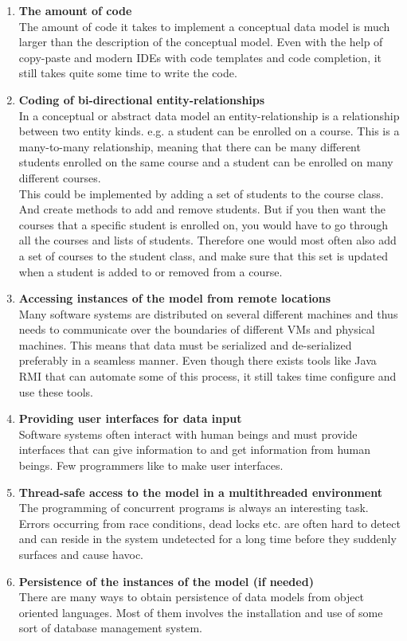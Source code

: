 \begin{enumerate}
\item \textbf{The amount of code}\\
The amount of code it takes to implement a conceptual data model is
much larger than the description of the conceptual model. Even with
the help of copy-paste and modern IDEs with code templates and code
completion, it still takes quite some time to write the code.
\item \textbf{Coding of bi-directional entity-relationships}\\
In a conceptual or abstract data model an entity-relationship is a
relationship between two entity kinds. e.g. a student can be enrolled
on a course. This is a many-to-many relationship, meaning that there
can be many different students enrolled on the same course and a student
can be enrolled on many different courses.\\
This could be implemented by adding a set of students to the course
class. And create methods to add and remove students. But if you then
want the courses that a specific student is enrolled on, you would
have to go through all the courses and lists of students. Therefore
one would most often also add a set of courses to the student class,
and make sure that this set is updated when a student is added to
or removed from a course.
\item \textbf{Accessing instances of the model from remote locations}\\
Many software systems are distributed on several different machines
and thus needs to communicate over the boundaries of different VMs
and physical machines. This means that data must be serialized and
de-serialized preferably in a seamless manner. Even though there exists
tools like Java RMI that can automate some of this process, it still
takes time configure and use these tools.
\item \textbf{Providing user interfaces for data input}\\
Software systems often interact with human beings and must provide
interfaces that can give information to and get information from human
beings. Few programmers like to make user interfaces.
\item \textbf{Thread-safe access to the model in a multithreaded environment}\\
The programming of concurrent programs is always an interesting task.
Errors occurring from race conditions, dead locks etc. are often hard
to detect and can reside in the system undetected for a long time
before they suddenly surfaces and cause havoc.
\item \textbf{Persistence of the instances of the model (if needed)}\\
There are many ways to obtain persistence of data models from object
oriented languages. Most of them involves the installation and use
of some sort of database management system.
\end{enumerate}
